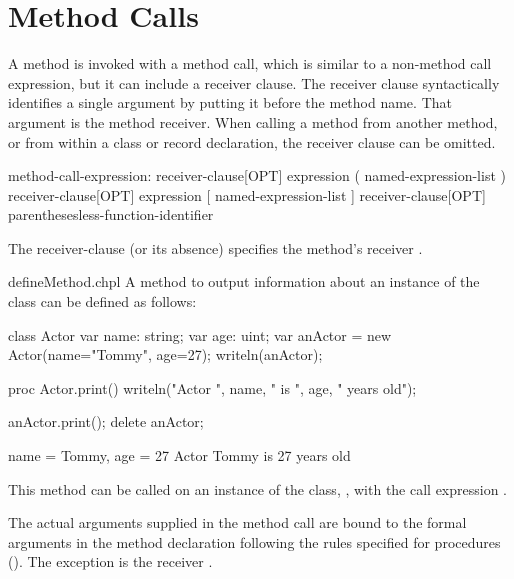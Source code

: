\section{Method Calls}
\label{Method_Calls}

A method is invoked with a method call, which is similar to a non-method
call expression, but it can include a receiver clause. The receiver
clause syntactically identifies a single argument by
putting it before the method name. That argument is the method receiver.
When calling a method from another method, or from within a class or
record declaration, the receiver clause can be omitted.

\begin{syntax}
method-call-expression:
  receiver-clause[OPT] expression ( named-expression-list )
  receiver-clause[OPT] expression [ named-expression-list ]
  receiver-clause[OPT] parenthesesless-function-identifier
\end{syntax}

The receiver-clause (or its absence) specifies the method's receiver
.

\begin{chapelexample}{defineMethod.chpl}
A method to output information about an instance of the 
class can be defined as follows:
\begin{chapelpre}
class Actor {
  var name: string;
  var age: uint;
}
var anActor = new Actor(name="Tommy", age=27);
writeln(anActor);
\end{chapelpre}
\begin{chapel}
proc Actor.print() {
  writeln("Actor ", name, " is ", age, " years old");
}
\end{chapel}
\begin{chapelpost}
anActor.print();
delete anActor;
\end{chapelpost}
\begin{chapeloutput}
{name = Tommy, age = 27}
Actor Tommy is 27 years old
\end{chapeloutput}
This method can be called on an instance of the 
class, , with the call expression .
\end{chapelexample}

The actual arguments supplied in the method call are bound to the
formal arguments in the method declaration following the rules specified for
procedures (). The exception is the receiver
.


